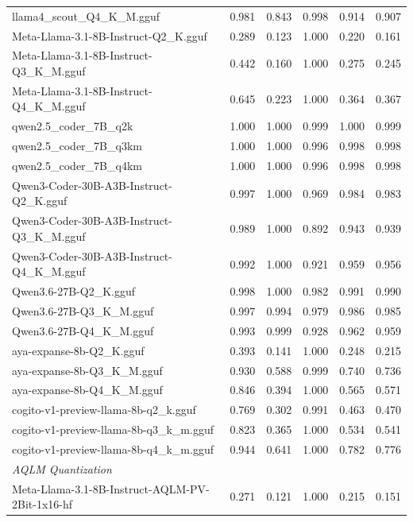 \begin{table}[htbp]
{\begin{tabular}{lrrrrr}
    llama4\_scout\_Q4\_K\_M.gguf & 0.981 & 0.843 & 0.998 & 0.914 & 0.907 \\
    Meta-Llama-3.1-8B-Instruct-Q2\_K.gguf & 0.289 & 0.123 & 1.000 & 0.220 & 0.161 \\
    Meta-Llama-3.1-8B-Instruct-Q3\_K\_M.gguf & 0.442 & 0.160 & 1.000 & 0.275 & 0.245 \\
    Meta-Llama-3.1-8B-Instruct-Q4\_K\_M.gguf & 0.645 & 0.223 & 1.000 & 0.364 & 0.367 \\
    qwen2.5\_coder\_7B\_q2k & 1.000 & 1.000 & 0.999 & 1.000 & \cellcolor{green!50}0.999 \\
    qwen2.5\_coder\_7B\_q3km & 1.000 & 1.000 & 0.996 & 0.998 & \cellcolor{green!30}0.998 \\
    qwen2.5\_coder\_7B\_q4km & 1.000 & 1.000 & 0.996 & 0.998 & \cellcolor{green!20}0.998 \\
    Qwen3-Coder-30B-A3B-Instruct-Q2\_K.gguf & 0.997 & 1.000 & 0.969 & 0.984 & 0.983 \\
    Qwen3-Coder-30B-A3B-Instruct-Q3\_K\_M.gguf & 0.989 & 1.000 & 0.892 & 0.943 & 0.939 \\
    Qwen3-Coder-30B-A3B-Instruct-Q4\_K\_M.gguf & 0.992 & 1.000 & 0.921 & 0.959 & 0.956 \\
    Qwen3.6-27B-Q2\_K.gguf & 0.998 & 1.000 & 0.982 & 0.991 & \cellcolor{green!10}0.990 \\
    Qwen3.6-27B-Q3\_K\_M.gguf & 0.997 & 0.994 & 0.979 & 0.986 & 0.985 \\
    Qwen3.6-27B-Q4\_K\_M.gguf & 0.993 & 0.999 & 0.928 & 0.962 & 0.959 \\
    aya-expanse-8b-Q2\_K.gguf & 0.393 & 0.141 & 1.000 & 0.248 & 0.215 \\
    aya-expanse-8b-Q3\_K\_M.gguf & 0.930 & 0.588 & 0.999 & 0.740 & 0.736 \\
    aya-expanse-8b-Q4\_K\_M.gguf & 0.846 & 0.394 & 1.000 & 0.565 & 0.571 \\
    cogito-v1-preview-llama-8b-q2\_k.gguf & 0.769 & 0.302 & 0.991 & 0.463 & 0.470 \\
    cogito-v1-preview-llama-8b-q3\_k\_m.gguf & 0.823 & 0.365 & 1.000 & 0.534 & 0.541 \\
    cogito-v1-preview-llama-8b-q4\_k\_m.gguf & 0.944 & 0.641 & 1.000 & 0.782 & 0.776 \\
    \midrule
    \multicolumn{6}{l}{\textit{AQLM Quantization}} \\
    \midrule
    Meta-Llama-3.1-8B-Instruct-AQLM-PV-2Bit-1x16-hf & 0.271 & 0.121 & 1.000 & 0.215 & 0.151 \\

\end{tabular}}
\end{table}
